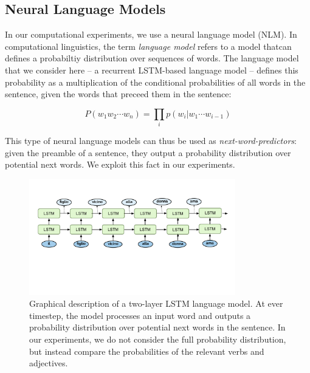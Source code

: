 \subsection{Neural Language Models}

In our computational experiments, we use a neural language model (NLM).
In computational linguistics, the term \emph{language model} refers to a model thatcan defines a probabiltiy distribution over sequences of words.
The language model that we consider here -- a recurrent LSTM-based language model -- defines this probability as a multiplication of the conditional probabilities of all words in the sentence, given the words that preceed them in the sentence:

\begin{equation}
    P(w_1 w_2 \cdots w_n) = \prod_i p(w_i|w_1 \cdots w_{i-1})
\end{equation}

This type of neural language models can thus be used as \emph{next-word-predictors}: given the preamble of a sentence, they output a probability distribution over potential next words.
We exploit this fact in our experiments.

\begin{figure}
    \centering
    \includegraphics[width=0.8\textwidth, clip, trim={10mm 50mm 10mm 20mm}]{figures/LM-image}
    \caption{Graphical description of a two-layer LSTM language model. 
        At ever timestep, the model processes an input word and outputs a probability distribution over potential next words in the sentence.
    In our experiments, we do not consider the full probability distribution, but instead compare the probabilities of the relevant verbs and adjectives.
    }
\end{figure}


